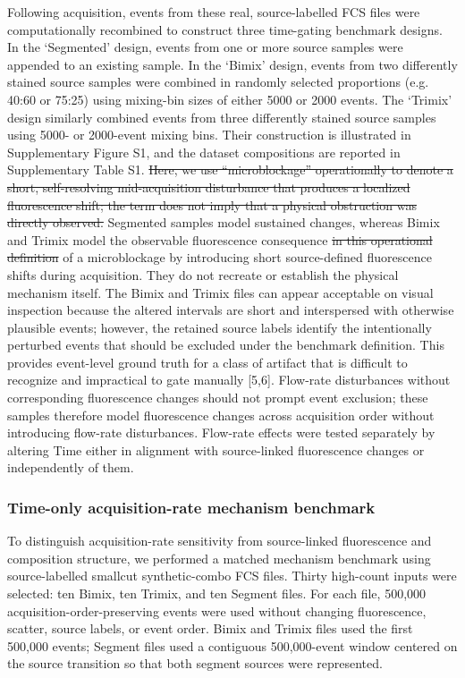 \documentclass[ASNA]{latex/wiley/USG}
\begin{document}
Following acquisition, events from these real, source-labelled FCS files
were computationally recombined to construct three time-gating benchmark
designs. In the `Segmented' design, events from one or more source
samples were appended to an existing sample. In the `Bimix' design,
events from two differently stained source samples were combined in
randomly selected proportions (e.g. 40:60 or 75:25) using mixing-bin
sizes of either 5000 or 2000 events. The `Trimix' design similarly
combined events from three differently stained source samples using
5000- or 2000-event mixing bins. Their construction is illustrated in
Supplementary Figure S1, and the dataset compositions are reported in
Supplementary Table S1. {\color{revisionred}\sout{Here, we use
``microblockage'' operationally to denote a short, self-resolving
mid-acquisition disturbance that produces a localized fluorescence
shift; the term does not imply that a physical obstruction was directly
observed.}} Segmented samples model sustained changes, whereas Bimix and
Trimix model the observable fluorescence consequence
{\color{revisionred}\sout{in this operational definition}}
{\color{revisionblue}of a microblockage} by introducing short
source-defined fluorescence shifts during acquisition. They do not
recreate or establish the physical mechanism itself. The Bimix and
Trimix files can appear acceptable on visual inspection because the
altered intervals are short and interspersed with otherwise plausible
events; however, the retained source labels identify the intentionally
perturbed events that should be excluded under the benchmark definition.
This provides event-level ground truth for a class of artifact that is
difficult to recognize and impractical to gate manually {[}5,6{]}.
Flow-rate disturbances without corresponding fluorescence changes should
not prompt event exclusion; these samples therefore model fluorescence
changes across acquisition order without introducing flow-rate
disturbances. Flow-rate effects were tested separately by altering Time
either in alignment with source-linked fluorescence changes or
independently of them.

\subsubsection{Time-only acquisition-rate mechanism
benchmark}\label{time-only-acquisition-rate-mechanism-benchmark}

To distinguish acquisition-rate sensitivity from source-linked
fluorescence and composition structure, we performed a matched mechanism
benchmark using source-labelled smallcut synthetic-combo FCS files.
Thirty high-count inputs were selected: ten Bimix, ten Trimix, and ten
Segment files. For each file, 500,000 acquisition-order-preserving
events were used without changing fluorescence, scatter, source labels,
or event order. Bimix and Trimix files used the first 500,000 events;
Segment files used a contiguous 500,000-event window centered on the
source transition so that both segment sources were represented.
\end{document}
